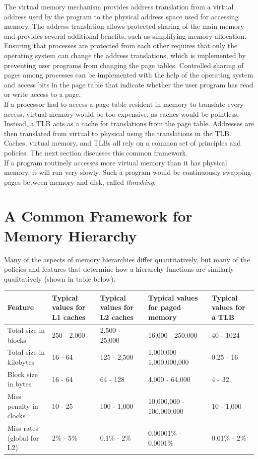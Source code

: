 \documentclass[12pt]{article}
\theoremstyle{definition}
\begin{document}
  The virtual memory mechanism provides address translation from a virtual address used by the program to the physical address space used for accessing memory.
  The address translation allows protected sharing of the main memory and provides several additional benefits, such as simplifying memory allocation.
  Ensuring that processes are protected from each other requires that only the operating system can change the address translations, which is implemented by preventing user programs from changing the page tables.
  Controlled sharing of pages among processes can be implemented with the help of the operating system and access bits in the page table that indicate whether the user program has read or write access to a page. \\

  If a processor had to access a page table resident in memory to translate every access, virtual memory would be too expensive, as caches would be pointless.
  Instead, a TLB acts as a cache for translations from the page table.
  Addresses are then translated from virtual to physical using the translations in the TLB. \\

  Caches, virtual memory, and TLBs all rely on a common set of principles and policies.
  The next section discusses this common framework. \\

  If a program routinely accesses more virtual memory than it has physical memory, it will run very slowly.
  Such a program would be continuously swapping pages between memory and disk, called \emph{thrashing}.

  \section{A Common Framework for Memory Hierarchy}
  Many of the aspects of memory hierarchies differ quantitatively, but many of the policies and features that determine how a hierarchy functions are similarly qualitatively (shown in table below).
  \begin{center}
  \begin{tabular}{| C{2.5cm} | C{2cm} | C{2.5cm} | C{2.58cm} | C{2.1cm} |}
  \hline
  Feature & Typical values for L1 caches & Typical values for L2 caches
  & Typical values for paged memory & Typical values for a TLB \\
  \hline
  \small Total size in blocks & 250 - 2,000 & 2,500 - 25,000 & 16,000 - 250,000 & 40 - 1024 \\
  \hline
  \small Total size in kilobytes & 16 - 64 & 125 - 2,500 & 1,000,000 - 1,000,000,000 & 0.25 - 16 \\
  \hline
  \small Block size in bytes & 16 - 64 & 64 - 128 & 4,000 - 64,000 & 4 - 32 \\
  \hline
  \small Miss penalty in clocks & 10 - 25 & 100 - 1,000 & 10,000,000 - 100,000,000 & 10 - 1,000 \\
  \hline
  \small Miss rates (global for L2) & 2\% - 5\% & 0.1\% - 2\% & 0.00001\% - 0.0001\% & 0.01\% - 2\% \\
  \hline
  \end{tabular}
  \end{center}
\end{document}
